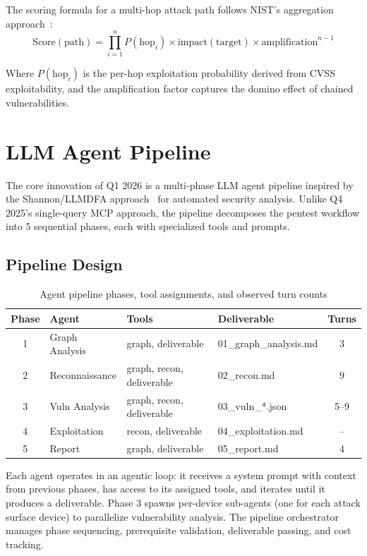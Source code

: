 \documentclass[11pt,a4paper]{article}
\begin{document}
The scoring formula for a multi-hop attack path follows NIST's aggregation approach~\cite{nist_aggregation}:
\[
\text{Score}(\text{path}) = \prod_{i=1}^{n} P(\text{hop}_i) \times \text{impact}(\text{target}) \times \text{amplification}^{n-1}
\]

Where $P(\text{hop}_i)$ is the per-hop exploitation probability derived from CVSS exploitability, and the amplification factor captures the domino effect of chained vulnerabilities.

\section{LLM Agent Pipeline}

The core innovation of Q1 2026 is a multi-phase LLM agent pipeline inspired by the Shannon/LLMDFA approach~\cite{shannon_llmdfa} for automated security analysis. Unlike Q4 2025's single-query MCP approach, the pipeline decomposes the pentest workflow into 5 sequential phases, each with specialized tools and prompts.

\subsection{Pipeline Design}

\begin{table}[H]
\centering
\begin{tabular}{@{}clllc@{}}
\toprule
\textbf{Phase} & \textbf{Agent} & \textbf{Tools} & \textbf{Deliverable} & \textbf{Turns} \\
\midrule
1 & Graph Analysis & graph, deliverable & 01\_graph\_analysis.md & 3 \\
2 & Reconnaissance & graph, recon, deliverable & 02\_recon.md & 9 \\
3 & Vuln Analysis & graph, recon, deliverable & 03\_vuln\_*.json & 5--9 \\
4 & Exploitation & recon, deliverable & 04\_exploitation.md & -- \\
5 & Report & graph, deliverable & 05\_report.md & 4 \\
\bottomrule
\end{tabular}
\caption{Agent pipeline phases, tool assignments, and observed turn counts}
\label{tab:pipeline}
\end{table}

Each agent operates in an agentic loop: it receives a system prompt with context from previous phases, has access to its assigned tools, and iterates until it produces a deliverable. Phase 3 spawns per-device sub-agents (one for each attack surface device) to parallelize vulnerability analysis. The pipeline orchestrator manages phase sequencing, prerequisite validation, deliverable passing, and cost tracking.
\end{document}

